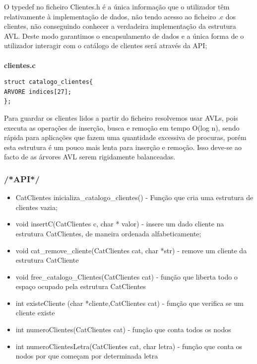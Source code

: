 O typedef no ficheiro Clientes.h é a única informação que o utilizador têm relativamente à implementação de dados, não tendo acesso ao ficheiro .c dos clientes, não conseguindo conhecer a verdadeira implementação da estrutura AVL. Deste modo garantimos o encapsulamento de dados e a única forma de o utilizador interagir com o catálogo de clientes será através da API; 


\paragraph{}
\textbf{clientes.c}
\begin{verbatim}
struct catalogo_clientes{
ARVORE indices[27];
};
\end{verbatim}

Para guardar os clientes lidos a partir do ficheiro resolvemos usar  AVLs, pois  executa as operações de inserção, busca e remoção em tempo O(log n), sendo rápida  para aplicações que fazem uma quantidade excessiva de procuras, porém esta estrutura é um pouco mais lenta para inserção e remoção. Isso deve-se ao facto de as árvores AVL serem rigidamente balanceadas.


\subsubsection{/*API*/}
\begin{itemize}

\item CatClientes inicializa\_catalogo\_clientes() - Função que cria uma estrutura de clientes vazia;

\item void insertC(CatClientes c, char * valor) - insere um dado cliente na estrutura CatClientes, de maneira ordenada alfabeticamente; 

\item void cat\_remove\_cliente(CatClientes cat, char *str) - remove um cliente da estrutura CatCliente 

\item void free\_catalogo\_Clientes(CatClientes cat) - função que liberta todo o espaço ocupado pela estrutura CatClientes

\item int existeCliente (char *cliente,CatClientes cat) - função que verifica se um cliente existe
\item int numeroClientes(CatClientes cat) - função que conta todos os nodos

\item int numeroClientesLetra(CatClientes cat, char letra) - função que conta os nodos por que começam por determinada letra


\end{itemize}

